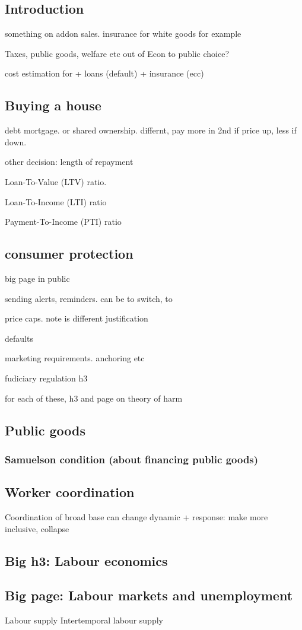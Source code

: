 
\subsection{Introduction}

something on addon sales. insurance for white goods for example

Taxes, public goods, welfare etc out of Econ to public choice?

cost estimation for
+ loans (default)
+ insurance (ecc)

\subsection{Buying a house}
debt mortgage. or shared ownership. differnt, pay more in 2nd if price up, less if down.

other decision: length of repayment

Loan-To-Value (LTV) ratio.

Loan-To-Income (LTI) ratio

Payment-To-Income (PTI) ratio

\subsection{consumer protection}
big page in public

sending alerts, reminders. can be to switch, to

price caps. note is different justification

defaults

marketing requirements. anchoring etc

fudiciary regulation h3

for each of these, h3 and page on theory of harm
\subsection{Public goods}
\subsubsection{Samuelson condition (about financing public goods)}
\subsection{Worker coordination}
Coordination of broad base can change dynamic
+ response: make more inclusive, collapse
\subsection{Big h3: Labour economics}
\subsection{Big page: Labour markets and unemployment}
Labour supply
Intertemporal labour supply



